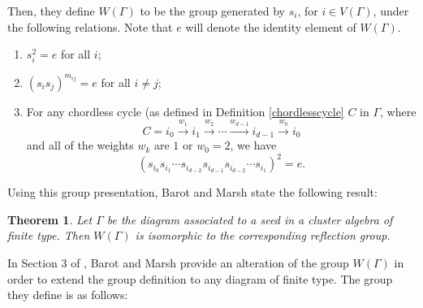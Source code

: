 \documentclass[11pt]{amsart}
\newtheorem{thm}{Theorem}[section]
\theoremstyle{definition}
\newcommand\V{V(\Gamma)}
\begin{document}
Then, they define $W(\Gamma)$ to be the group generated by $s_i$, for $i \in \V$, under the following relations. Note that $e$ will denote the identity element of $W(\Gamma)$.
\begin{enumerate}
\item $s_i^2 = e$ for all $i$;
\item $(s_is_j)^{m_{ij}} = e$ for all $i \neq j$;
\item For any chordless cycle (as defined in Definition \ref{chordlesscycle} $C$ in $\Gamma$, where
\begin{displaymath}
C = i_0 \xrightarrow{w_1} i_1 \xrightarrow{w_2} \cdots \xrightarrow{w_{d-1}} i_{d-1} \xrightarrow{w_0} i_0
\end{displaymath}
and all of the weights $w_k$ are $1$ or $w_0 = 2$, we have
\begin{displaymath}
(s_{i_0}s_{i_1}\cdots s_{i_{d-2}}s_{i_{d-1}}s_{i_{d-2}}\cdots s_{i_1})^2 =e.
\end{displaymath}
\end{enumerate}

Using this group presentation, Barot and Marsh state the following result:
\begin{thm}\label{thm:barot_and_marsh_A}\cite[Theorem A]{BM13}
Let $\Gamma$ be the diagram associated to a seed in a cluster algebra of finite type. Then $W(\Gamma)$ is isomorphic to the corresponding reflection group.
\end{thm}

In Section 3 of \cite{BM13}, Barot and Marsh provide an alteration of the group $W(\Gamma)$ in order to extend the group definition to any diagram of finite type. The group they define is as follows:
\end{document}

